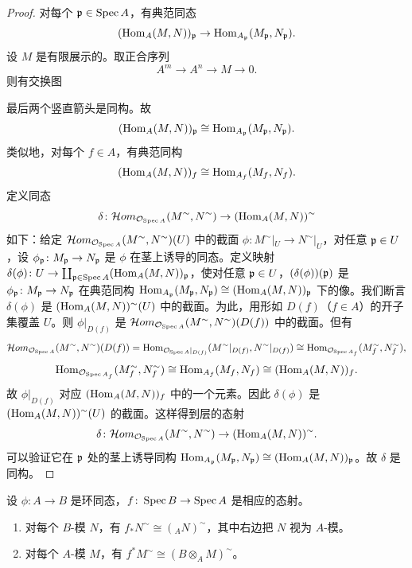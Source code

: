 \begin{proof}
对每个 $\mathfrak{p}\in\operatorname{Spec} A$，有典范同态
\[
(\operatorname{Hom}_A(M,N))_{\mathfrak{p}}\to\operatorname{Hom}_{A_{\mathfrak{p}}}(M_{\mathfrak{p}},N_{\mathfrak{p}}).
\]
设 $M$ 是有限展示的。取正合序列
\[
A^m\to A^n\to M\to0.
\]
则有交换图
\begin{center}
\end{center}
最后两个竖直箭头是同构。故
\[
(\operatorname{Hom}_A(M,N))_{\mathfrak{p}}\cong\operatorname{Hom}_{A_{\mathfrak{p}}}(M_{\mathfrak{p}},N_{\mathfrak{p}}).
\]
类似地，对每个 $f\in A$，有典范同构
\[
(\operatorname{Hom}_A(M,N))_f\cong\operatorname{Hom}_{A_f}(M_f,N_f).
\]
定义同态
\[
\delta\colon\mathcal{H}om_{\mathcal{O}_{\operatorname{Spec} A}}(M^\sim,N^\sim)\to(\operatorname{Hom}_A(M,N))^\sim
\]
如下：给定 $\mathcal{H}om_{\mathcal{O}_{\operatorname{Spec} A}}(M^\sim,N^\sim)(U)$ 中的截面 $\phi\colon M^\sim|_U\to N^\sim|_U$，对任意 $\mathfrak{p}\in U$，设 $\phi_{\mathfrak{p}}\colon M_{\mathfrak{p}}\to N_{\mathfrak{p}}$ 是 $\phi$ 在茎上诱导的同态。定义映射 $\delta(\phi)\colon U\to\coprod_{\mathfrak{p}\in\operatorname{Spec} A}(\operatorname{Hom}_A(M,N))_{\mathfrak{p}}$，使对任意 $\mathfrak{p}\in U$，$(\delta(\phi))(\mathfrak{p})$ 是 $\phi_{\mathfrak{p}}\colon M_{\mathfrak{p}}\to N_{\mathfrak{p}}$ 在典范同构 $\operatorname{Hom}_{A_{\mathfrak{p}}}(M_{\mathfrak{p}},N_{\mathfrak{p}})\cong(\operatorname{Hom}_A(M,N))_{\mathfrak{p}}$ 下的像。我们断言 $\delta(\phi)$ 是 $(\operatorname{Hom}_A(M,N))^\sim(U)$ 中的截面。为此，用形如 $D(f)$（$f\in A$）的开子集覆盖 $U$。则 $\phi|_{D(f)}$ 是 $\mathcal{H}om_{\mathcal{O}_{\operatorname{Spec} A}}(M^\sim,N^\sim)(D(f))$ 中的截面。但有
\[
\mathcal{H}om_{\mathcal{O}_{\operatorname{Spec} A}}(M^\sim,N^\sim)(D(f))
=\operatorname{Hom}_{\mathcal{O}_{\operatorname{Spec} A}|_{D(f)}}(M^\sim|_{D(f)},N^\sim|_{D(f)})
\cong\operatorname{Hom}_{\mathcal{O}_{\operatorname{Spec} A_f}}(M_f^\sim,N_f^\sim),
\]
\[
\operatorname{Hom}_{\mathcal{O}_{\operatorname{Spec} A_f}}(M_f^\sim,N_f^\sim)\cong\operatorname{Hom}_{A_f}(M_f,N_f)\cong(\operatorname{Hom}_A(M,N))_f.
\]
故 $\phi|_{D(f)}$ 对应 $(\operatorname{Hom}_A(M,N))_f$ 中的一个元素。因此 $\delta(\phi)$ 是 $(\operatorname{Hom}_A(M,N))^\sim(U)$ 的截面。这样得到层的态射
\[
\delta\colon\mathcal{H}om_{\mathcal{O}_{\operatorname{Spec} A}}(M^\sim,N^\sim)\to(\operatorname{Hom}_A(M,N))^\sim.
\]
可以验证它在 $\mathfrak{p}$ 处的茎上诱导同构 $\operatorname{Hom}_{A_{\mathfrak{p}}}(M_{\mathfrak{p}},N_{\mathfrak{p}})\cong(\operatorname{Hom}_A(M,N))_{\mathfrak{p}}$。故 $\delta$ 是同构。
\end{proof}

\begin{proposition}\label{it:1.4.3}
设 $\phi\colon A\to B$ 是环同态，$f\colon\operatorname{Spec} B\to\operatorname{Spec} A$ 是相应的态射。
\begin{enumerate}[label=(\roman*),leftmargin=2.8em]
  \item 对每个 $B$-模 $N$，有 $f_*N^\sim\cong({}_A N)^\sim$，其中右边把 $N$ 视为 $A$-模。
  \item 对每个 $A$-模 $M$，有 $f^*M^\sim\cong(B\otimes_A M)^\sim$。
\end{enumerate}
\end{proposition}

